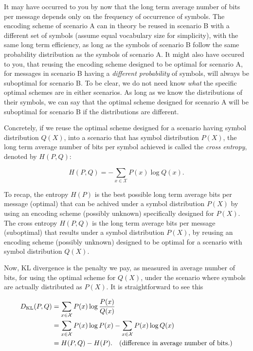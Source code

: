 It may have occurred to you by now that the long term average number of bits per message depends only
on the frequency of occurrence of symbols. The encoding scheme of scenario A can in theory be
reused in scenario B with a different set of symbols (assume equal vocabulary size for simplicity),
with the same long term efficiency, as long as the symbols of scenario B follow the same probability
distribution as the symbols of scenario A. It might also have occured to you, that reusing the encoding scheme
designed to be optimal for scenario A, for messages in scenario B having a \emph{different probability} of symbols, will always
be suboptimal for scenario B. To be clear, we do not need know \emph{what} the specific optimal
schemes are in either scenarios. As long as we know the distributions of their symbols,
we can say that the optimal scheme designed for scenario A will be suboptimal for scenario B if the
distributions are different.

Concretely, if we reuse the optimal scheme designed for a scenario having symbol distribution $Q(X)$,
into a scenario that has symbol distribution $P(X)$, the long term average
number of bits per symbol achieved is called the \emph{cross entropy}, denoted by $H(P, Q)$:

$$H(P, Q) = -\sum_{x \in \mathcal{X}} P(x) \log Q(x). $$

To recap, the entropy $H(P)$ is the best possible long term average bits per message (optimal) that
can be achived under a symbol distribution $P(X)$ by using an encoding scheme (possibly unknown)
specifically designed for $P(X)$. The cross entropy $H(P, Q)$ is the long term average bits per
message (suboptimal) that results under a symbol distribution $P(X)$, by reusing an encoding
scheme (possibly unknown) designed to be optimal for a scenario with symbol distribution $Q(X)$.

Now, KL divergence is the penalty we pay, as measured in average number of bits, for using the
optimal scheme for $Q(X)$, under the scenario where symbols are actually distributed as $P(X)$. It is
straightforward to see this

\begin{align*}
D_{\text{KL}}(P, Q) &= \sum_{x \in \mathcal{X}} P(x) \log\frac{P(x)}{Q(x)} \\
&= \sum_{x \in \mathcal{X}} P(x) \log P(x) - \sum_{x\in \mathcal{X}}P(x) \log Q(x) \\
&= H(P, Q) - H(P). \quad \text{(difference in average number of bits.)}
\end{align*}

